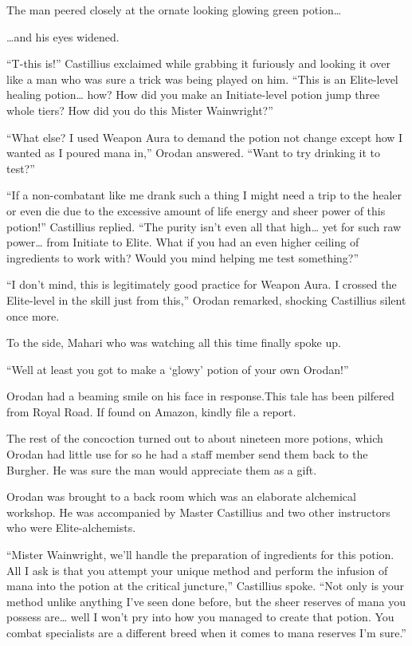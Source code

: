 \documentclass[a4paper,10pt]{book}
\begin{document}
The man peered closely at the ornate looking glowing green potion…\par
…and his eyes widened.\par
“T-this is!” Castillius exclaimed while grabbing it furiously and looking it over like a man who was sure a trick was being played on him. “This is an Elite-level healing potion… how? How did you make an Initiate-level potion jump three whole tiers? How did you do this Mister Wainwright?”\par
“What else? I used Weapon Aura to demand the potion not change except how I wanted as I poured mana in,” Orodan answered. “Want to try drinking it to test?”\par
“If a non-combatant like me drank such a thing I might need a trip to the healer or even die due to the excessive amount of life energy and sheer power of this potion!” Castillius replied. “The purity isn’t even all that high… yet for such raw power… from Initiate to Elite. What if you had an even higher ceiling of ingredients to work with? Would you mind helping me test something?”\par
“I don’t mind, this is legitimately good practice for Weapon Aura. I crossed the Elite-level in the skill just from this,” Orodan remarked, shocking Castillius silent once more.\par
To the side, Mahari who was watching all this time finally spoke up.\par
“Well at least you got to make a ‘glowy’ potion of your own Orodan!”\par
Orodan had a beaming smile on his face in response.This tale has been pilfered from Royal Road. If found on Amazon, kindly file a report.\par
\par
The rest of the concoction turned out to about nineteen more potions, which Orodan had little use for so he had a staff member send them back to the Burgher. He was sure the man would appreciate them as a gift.\par
Orodan was brought to a back room which was an elaborate alchemical workshop. He was accompanied by Master Castillius and two other instructors who were Elite-alchemists.\par
“Mister Wainwright, we’ll handle the preparation of ingredients for this potion. All I ask is that you attempt your unique method and perform the infusion of mana into the potion at the critical juncture,” Castillius spoke. “Not only is your method unlike anything I’ve seen done before, but the sheer reserves of mana you possess are… well I won’t pry into how you managed to create that potion. You combat specialists are a different breed when it comes to mana reserves I’m sure.”\par
\end{document}
